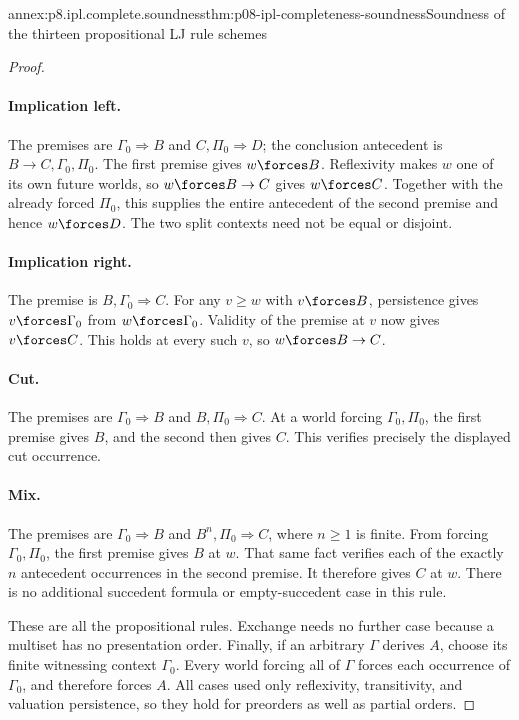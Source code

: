 \begin{annexitem}{annex:p8.ipl.complete.soundness}{thm:p08-ipl-completeness-soundness}{Soundness of the thirteen propositional LJ rule schemes}
\begin{proof}
\paragraph{Implication left.}
The premises are \(\Gamma_0\Rightarrow B\) and
\(C,\Pi_0\Rightarrow D\); the conclusion antecedent is
\(B\to C,\Gamma_0,\Pi_0\). The first premise gives
\(w\forces B\). Reflexivity makes \(w\) one of its own future
worlds, so \(w\forces B\to C\) gives \(w\forces C\).
Together with the already forced \(\Pi_0\), this supplies the entire
antecedent of the second premise and hence \(w\forces D\).
The two split contexts need not be equal or disjoint.

\paragraph{Implication right.}
The premise is \(B,\Gamma_0\Rightarrow C\). For any
\(v\geq w\) with \(v\forces B\), persistence gives
\(v\forces\Gamma_0\) from \(w\forces\Gamma_0\). Validity of the
premise at \(v\) now gives \(v\forces C\). This holds at every such
\(v\), so \(w\forces B\to C\).

\paragraph{Cut.}
The premises are \(\Gamma_0\Rightarrow B\) and
\(B,\Pi_0\Rightarrow C\). At a world forcing
\(\Gamma_0,\Pi_0\), the first premise gives \(B\), and the second
then gives \(C\). This verifies precisely the displayed cut occurrence.

\paragraph{Mix.}
The premises are \(\Gamma_0\Rightarrow B\) and
\(B^n,\Pi_0\Rightarrow C\), where \(n\geq1\) is finite. From
forcing \(\Gamma_0,\Pi_0\), the first premise gives \(B\) at
\(w\). That same fact verifies each of the exactly \(n\) antecedent
occurrences in the second premise. It therefore gives \(C\) at
\(w\). There is no additional succedent formula or empty-succedent
case in this rule.

These are all the propositional rules. Exchange needs no further case
because a multiset has no presentation order. Finally, if an arbitrary
\(\Gamma\) derives \(A\), choose its finite witnessing context
\(\Gamma_0\). Every world forcing all of \(\Gamma\) forces each
occurrence of \(\Gamma_0\), and therefore forces \(A\). All cases
used only reflexivity, transitivity, and valuation persistence, so they
hold for preorders as well as partial orders.
\end{proof}
\end{annexitem}

